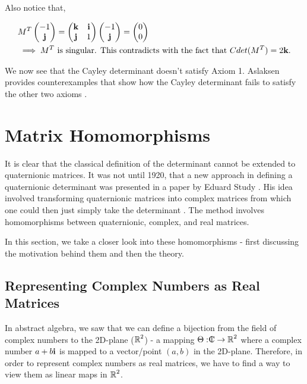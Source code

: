 Also notice that,

\begin{align*}
	&M^T\begin{pmatrix}
	-1 \\
	\textbf{j}
	\end{pmatrix} = 
	\begin{pmatrix}
	 		\textbf{k} & \textbf{i} \\
	 		\textbf{j} & 1
	\end{pmatrix}
	\begin{pmatrix}
	-1 \\
	\textbf{j}
	\end{pmatrix} = 
	\begin{pmatrix}
	0 \\
	0
	\end{pmatrix} \\ &\implies
	M^T \text{ is singular. This contradicts with the fact that $Cdet(M^T) = 2\textbf{k}$.}
\end{align*}

We now see that the Cayley determinant doesn't satisfy Axiom 1. Aslaksen provides counterexamples that show how the Cayley determinant fails to satisfy the other two axioms \cite{aslaksen}.

\section{Matrix Homomorphisms}

 It is clear that the classical definition of the determinant cannot be extended to quaternionic matrices. It was not until 1920, that a new approach in defining a quaternionic determinant was presented in a paper by Eduard Study \cite{aslaksen}. His idea involved transforming quaternionic matrices into complex matrices from which one could then just simply take the determinant \cite{aslaksen}. The method involves homomorphisms between quaternionic, complex, and real matrices. 

 In this section, we take a closer look into these homomorphisms - first discussing the motivation behind them and then the theory. 

\subsection{Representing Complex Numbers as Real Matrices}

In abstract algebra, we saw that we can define a bijection from the field of complex numbers to the 2D-plane ($\operatorname{\mathbb{R}}^2$) - a mapping $\Theta : {\rm l}\kern-.53em{\rm C} \rightarrow \operatorname{\mathbb{R}}^2$ where a complex number $a+b\textbf{i}$ is mapped to a vector/point $(a,b)$ in the 2D-plane. Therefore, in order to represent complex numbers as real matrices, we have to find a way to view them as linear maps in $\operatorname{\mathbb{R}}^2$. 

